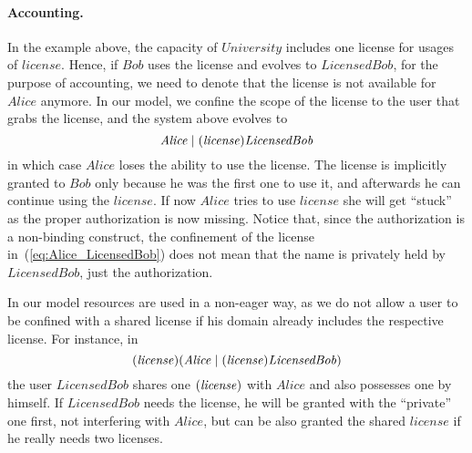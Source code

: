 \paragraph{{Accounting}.} In the example above, the capacity of $\mathit{University}$ includes one license for usages of $\mathit{license}$. Hence, if $\mathit{Bob}$ uses the license and evolves to $\mathit{LicensedBob}$, for the purpose of accounting, we need to denote that the license is not available for $\mathit{Alice}$ anymore. In our model, we confine the scope of the license to the user that grabs the license, and the system above evolves to 
% 
\begin{equation}\label{eq:Alice_LicensedBob}
 {\mathit{Alice} \;|\;(\mathit{license})\mathit{LicensedBob}}
\end{equation}
%
in which case $\mathit{Alice}$ loses the ability to use the license. The license is implicitly granted to $\mathit{Bob}$ only because he was the first one to use it, and afterwards he can continue using the $\mathit{license}$. If now $\mathit{Alice}$ tries to use $\mathit{license}$ she will get ``stuck'' as the proper authorization is now missing. Notice that, since the authorization is a non-binding construct, the confinement of the license in~(\ref{eq:Alice_LicensedBob}) does not mean that the name is privately held by 
$\mathit{LicensedBob}$, just the authorization. %

In our model resources are used in a non-eager way, as we do not allow a user to be confined with a shared license if his domain already includes the respective license. For instance, in 
\[
    { (\mathit{license}) (\mathit{Alice} \;|\; (\mathit{license})\mathit{LicensedBob})}
\]
the user $\mathit{LicensedBob}$ shares one $(\mathit{license})$ with $\mathit{Alice}$ and also possesses one by himself. If $\mathit{LicensedBob}$ needs the license, he will be granted with the ``private'' one first, not 
interfering with $\mathit{Alice}$, but can be also granted the shared $\mathit{license}$ if he really needs
two licenses.

